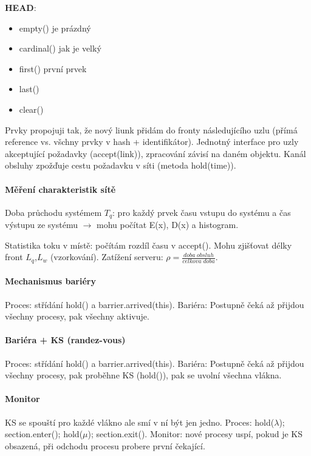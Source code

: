 \documentclass[11pt,a4paper]{scrartcl}
\begin{document}
   \textbf{HEAD}:
   \begin{itemize}
		\item empty() je prázdný
		\item cardinal() jak je velký
		\item first() první prvek
		\item last()
		\item clear()
   \end{itemize}

	Prvky propojuji tak, že nový liunk přidám do fronty následujícího uzlu (přímá reference vs. všchny prvky v hash + identifikátor). Jednotný interface pro uzly akceptující požadavky (accept(link)), zpracování závisí na daném objektu. Kanál obsluhy zpožďuje cestu požadavku v síti (metoda hold(time)).
	
	\paragraph{Měření charakteristik sítě} Doba průchodu systémem $T_q$: pro každý prvek času vstupu do systému a čas výstupu ze systému $\rightarrow$ mohu počítat E(x), D(x) a histogram. 
	
	Statistika toku v místě: počítám rozdíl času v accept(). Mohu zjišťovat délky front $L_q$,$L_w$ (vzorkování). Zatížení serveru: $\rho = \frac{doba \; obsluh}{celkova \; doba}$.
	
	\paragraph{Mechanismus bariéry} Proces: střídání hold() a barrier.arrived(this). Bariéra: Postupně čeká až přijdou všechny procesy, pak všechny aktivuje.
	
	\paragraph{Bariéra + KS (randez-vous)} Proces: střídání hold() a barrier.arrived(this). Bariéra: Postupně čeká až přijdou všechny procesy, pak proběhne KS (hold()), pak se uvolní všechna vlákna.
	
	\paragraph{Monitor} KS se spouští pro každé vlákno ale smí v ní být jen jedno. Proces: hold($\lambda$); section.enter(); hold($\mu$); section.exit(). Monitor: nové procesy uspí, pokud je KS obsazená, při odchodu procesu probere první čekající.
	
\end{document}
